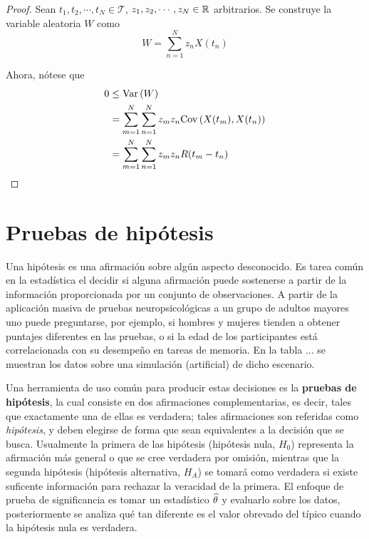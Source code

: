 \begin{proof}
Sean $t_1, t_2, \cdots, t_N \in \mathcal{T}$, $z_1, z_2, \cdots, z_N \in \mathbb{R}$ arbitrarios. Se construye la variable aleatoria $W$ como
\begin{equation}
W = \sum_{n=1}^{N} z_n X(t_n)
\end{equation}

Ahora, nótese que
\begin{align*}
0 &\leq \mathrm{Var}\left( W \right) \\
&= \sum_{m=1}^{N} \sum_{n=1}^{N} z_m z_n \mathrm{Cov}\left( X(t_m),X(t_n) \right) \\
&= \sum_{m=1}^{N} \sum_{n=1}^{N} z_m z_n R(t_m-t_n)
\end{align*}
\end{proof}


\section{Pruebas de hipótesis}


Una hipótesis es una afirmación sobre algún aspecto desconocido.
%
Es tarea común en la estadística el decidir si alguna afirmación puede sostenerse a partir de la
información proporcionada por un conjunto de observaciones. 
%
A partir de la aplicación masiva de pruebas neuropsicológicas a un grupo de adultos mayores uno 
puede preguntarse, por ejemplo, si hombres y mujeres tienden a obtener puntajes diferentes en las
pruebas, o si la edad de los participantes está correlacionada con su desempeño en tareas de 
memoria.
%
En la tabla ... se muestran los datos sobre una simulación (artificial) de dicho escenario.

Una herramienta de uso común para producir estas decisiones es la \textbf{pruebas de hipótesis},
la cual consiste en dos afirmaciones complementarias, es decir, tales que exactamente una de ellas es verdadera; tales afirmaciones
son referidas como \textit{hipótesis}, y deben elegirse de forma que sean equivalentes a la 
decisión que se busca. 
%
Usualmente la primera de las hipótesis (hipótesis nula, $H_0$) representa la afirmación más general o que se cree verdadera por omisión, mientras que la segunda hipótesis (hipótesis alternativa, $H_A$) se tomará como verdadera si
existe suficente información para rechazar la veracidad de la primera.
%
%
El enfoque de prueba de significancia es  tomar un estadístico $\widehat{ \theta }$ y evaluarlo sobre los datos, posteriormente se analiza qué tan diferente es el valor obrevado del típico cuando la hipótesis nula es verdadera.

